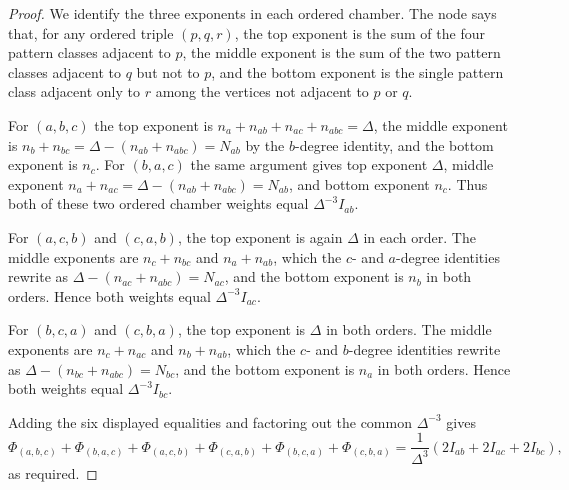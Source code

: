\begin{proof}
We identify the three exponents in each ordered chamber.  The node
 says that, for any ordered
triple $(p,q,r)$, the top exponent is the sum of the four pattern classes
adjacent to $p$, the middle exponent is the sum of the two pattern classes
adjacent to $q$ but not to $p$, and the bottom exponent is the single pattern
class adjacent only to $r$ among the vertices not adjacent to $p$ or $q$.

For $(a,b,c)$ the top exponent is
$n_a+n_{ab}+n_{ac}+n_{abc}=\Delta$, the middle exponent is
$n_b+n_{bc}=\Delta-(n_{ab}+n_{abc})=N_{ab}$ by the $b$-degree identity, and
the bottom exponent is $n_c$.  For $(b,a,c)$ the same argument gives top
exponent $\Delta$, middle exponent
$n_a+n_{ac}=\Delta-(n_{ab}+n_{abc})=N_{ab}$, and bottom exponent $n_c$.
Thus both of these two ordered chamber weights equal
$\Delta^{-3}I_{ab}$.

For $(a,c,b)$ and $(c,a,b)$, the top exponent is again $\Delta$ in each
order.  The middle exponents are $n_c+n_{bc}$ and $n_a+n_{ab}$, which the
$c$- and $a$-degree identities rewrite as
$\Delta-(n_{ac}+n_{abc})=N_{ac}$, and the bottom exponent is $n_b$ in both
orders.  Hence both weights equal $\Delta^{-3}I_{ac}$.

For $(b,c,a)$ and $(c,b,a)$, the top exponent is $\Delta$ in both orders.
The middle exponents are $n_c+n_{ac}$ and $n_b+n_{ab}$, which the $c$- and
$b$-degree identities rewrite as
$\Delta-(n_{bc}+n_{abc})=N_{bc}$, and the bottom exponent is $n_a$ in both
orders.  Hence both weights equal $\Delta^{-3}I_{bc}$.

Adding the six displayed equalities and factoring out the common
$\Delta^{-3}$ gives
\[
\Phi_{(a,b,c)}+\Phi_{(b,a,c)}
{}+\Phi_{(a,c,b)}+\Phi_{(c,a,b)}
{}+\Phi_{(b,c,a)}+\Phi_{(c,b,a)}
=
\frac1{\Delta^3}(2I_{ab}+2I_{ac}+2I_{bc}),
\]
as required.
\end{proof}

